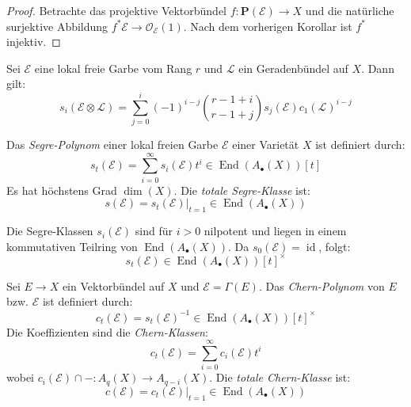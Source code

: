 \documentclass[10pt,a4paper]{article}
\begin{document}
\begin{proof}
Betrachte das projektive Vektorbündel $f: \mathbf{P}(\mathcal{E})\to X$ und die natürliche surjektive Abbildung $f^\ast\mathcal{E}\to\mathcal{O}_\mathcal{E}(1)$. Nach dem vorherigen Korollar ist $f^\ast$ injektiv.
\end{proof}

\begin{proposition}
Sei $\mathcal{E}$ eine lokal freie Garbe vom Rang $r$ und $\mathcal{L}$ ein Geradenbündel auf $X$. Dann gilt:
\[ s_i(\mathcal{E}\otimes\mathcal{L}) = \sum_{j=0}^i(-1)^{i-j} \binom{r-1+i}{r-1+j}s_j(\mathcal{E}) c_1(\mathcal{L})^{i-j} \]
\end{proposition}

\begin{definition}
Das \textit{Segre-Polynom} einer lokal freien Garbe $\mathcal{E}$ einer Varietät $X$ ist definiert durch:
\[ s_t(\mathcal{E}) = \sum_{i = 0}^\infty s_i(\mathcal{E})t^i \in\operatorname{End}(A_\bullet(X))[t] \]
Es hat höchstens Grad $\dim(X)$. Die \textit{totale Segre-Klasse} ist:
\[ s(\mathcal{E}) = s_t(\mathcal{E})|_{t = 1} \in\operatorname{End}(A_\bullet(X)) \]
\end{definition}

\begin{remark}
Die Segre-Klassen $s_i(\mathcal{E})$ sind für $i>0$  nilpotent und liegen in einem kommutativen Teilring von $\operatorname{End}(A_\bullet(X))$. Da $s_0(\mathcal{E}) = \operatorname{id}$, folgt:
\[ s_t(\mathcal{E}) \in\operatorname{End}(A_\bullet(X))[t]^\times \]
\end{remark}

\begin{definition}
Sei $E\to X$ ein Vektorbündel auf $X$ und $\mathcal{E} = \Gamma(E)$. Das \textit{Chern-Polynom} von $E$ bzw. $\mathcal{E}$ ist definiert durch:
\[ c_t(\mathcal{E}) = s_t(\mathcal{E})^{-1} \in\operatorname{End}(A_\bullet(X))[t]^\times \]
Die Koeffizienten sind die \textit{Chern-Klassen}:   
\[ c_t(\mathcal{E}) = \sum_{i =0}^\infty c_i(\mathcal{E}) t^i \]
wobei $c_i(\mathcal{E})\cap - : A_q(X)\to A_{q-i}(X)$. Die \textit{totale Chern-Klasse} ist:
\[ c(\mathcal{E}) = c_t(\mathcal{E})|_{t =1}\in\operatorname{End}(A_\bullet(X)) \]
\end{definition}
\end{document}

